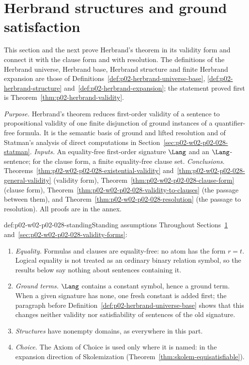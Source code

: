 \section{Herbrand structures and ground satisfaction}
\label{sec:p02-w02-p02-028-herbrand-structures}

This section and the next prove Herbrand's theorem in its validity form and
connect it with the clause form and with resolution.  The definitions of the
Herbrand universe, Herbrand base, Herbrand structure and finite Herbrand
expansion are those of
Definitions~\ref{def:p02-herbrand-universe-base},
\ref{def:p02-herbrand-structure} and~\ref{def:p02-herbrand-expansion}; the
statement proved first is Theorem~\ref{thm:p02-herbrand-validity}.

\emph{Purpose.}  Herbrand's theorem reduces first-order validity of a sentence
to propositional validity of one finite disjunction of ground instances of a
quantifier-free formula.  It is the semantic basis of ground and lifted
resolution and of Statman's analysis of direct computations in
Section~\ref{sec:p02-w02-p02-028-statman}.
\emph{Inputs.}  An equality-free first-order signature \(\Lang\) and an
\(\Lang\)-sentence; for the clause form, a finite equality-free clause set.
\emph{Conclusions.}  Theorems~\ref{thm:p02-w02-p02-028-existential-validity}
and~\ref{thm:p02-w02-p02-028-general-validity} (validity form),
Theorem~\ref{thm:p02-w02-p02-028-clause-form} (clause form),
Theorem~\ref{thm:p02-w02-p02-028-validity-to-clauses} (the passage between
them), and Theorem~\ref{thm:p02-w02-p02-028-resolution} (the passage to
resolution).  All proofs are in the annex.

\begin{hbconvention}{def:p02-w02-p02-028-standing}{Standing assumptions}
Throughout Sections~\ref{sec:p02-w02-p02-028-herbrand-structures}
and~\ref{sec:p02-w02-p02-028-validity-forms}:
\begin{enumerate}
  \item \emph{Equality.}  Formulas and clauses are equality-free: no atom has
        the form \(r=t\).  Logical equality is not treated as an ordinary
        binary relation symbol, so the results below say nothing about
        sentences containing it.
  \item \emph{Ground terms.}  \(\Lang\) contains a constant symbol, hence a
        ground term.  When a given signature has none, one fresh constant is
        added first; the paragraph before
        Definition~\ref{def:p02-herbrand-universe-base} shows that this
        changes neither validity nor satisfiability of sentences of the old
        signature.
  \item \emph{Structures} have nonempty domains, as everywhere in this part.
  \item \emph{Choice.}  The Axiom of Choice is used only where it is named:
        in the expansion direction of Skolemization
        (Theorem~\ref{thm:skolem-equisatisfiable}).
\end{enumerate}
\end{hbconvention}

